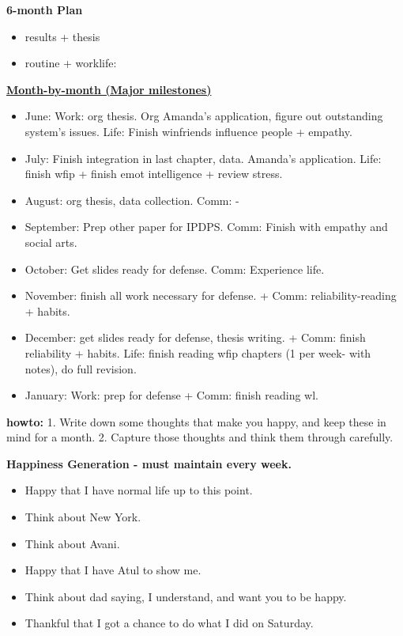 \documentclass[11pt]{article}
\begin{document}
\textbf{6-month Plan} 
\begin{itemize} 
  \tiny \item \tiny results + thesis
\item \tiny routine + worklife:
\end{itemize}

\newpage
    {\small \underline{\textbf{Month-by-month (Major milestones)}}}\\ 
    \begin{itemize}
      \small \item \small June: Work: org thesis. Org Amanda's application, figure out outstanding system's issues. Life: Finish winfriends influence people + empathy. 
    \item \small July: Finish integration in last chapter, data. Amanda's application. Life: finish wfip + finish emot intelligence + review stress. 
    \item \small August: org thesis, data collection. Comm:  - 
    \item \small September: Prep other paper for IPDPS. Comm: Finish with empathy and social arts. 
    \item \small October: Get slides ready for defense. Comm: Experience life. 
    \item \small November: finish all work necessary for defense.  + Comm: reliability-reading + habits. 
    \item \small December: get slides ready for defense, thesis writing.  + Comm: finish reliability + habits.  Life:
      finish reading wfip chapters (1 per week- with notes), 
      do full revision. 
    \item \small January: Work: prep for defense  +  Comm: finish reading wl. 
    \end{itemize} 

\newpage 
\textbf{howto:} 1. Write down some thoughts that make you happy, and keep these in mind for a month.  2. Capture those thoughts and think them through carefully. 

\textbf{Happiness Generation - must maintain every week.}
\begin{itemize}
  \tiny \item \tiny Happy that I have normal life up to this point.
  \item \tiny Think about New York. 
  \item \tiny Think about Avani. 
  \item \tiny Happy that I have Atul to show me.
  \item \tiny Think about dad saying, I understand, and want you to be happy. 
  \item \tiny Thankful that I got a chance to do what I did on Saturday. 
\end{itemize} 
\end{document}
